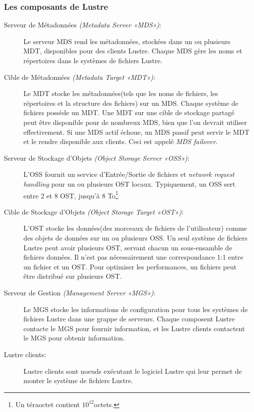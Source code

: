 \documentclass[12pt]{article}
\begin{document}
\subsubsection{Les composants de Lustre}
\begin{description}
\item[Serveur de Métadonnées \textit{(Metadata Server «MDS»)}:]
Le serveur MDS rend les métadonnées, stockées dans un ou plusieurs MDT, disponibles pour des clients Lustre. Chaque MDS gère les noms et répertoires dans le systèmes de fichiers Lustre.
\item[Cible de Métadonnées \textit{(Metadata Target «MDT»)}:] Le MDT stocke les métadonnées(tels que les noms de fichiers, les répertoires et la structure des fichiers) sur un MDS. Chaque système de fichiers possède un MDT. Une MDT sur une cible de stockage partagé peut être disponible pour de nombreux MDS, bien que l'on devrait utiliser effectivement. Si une MDS actif échoue, un MDS passif peut servir le MDT et le rendre disponible aux clients. Ceci est appelé \textit{MDS failover}.
\item[Serveur de Stockage d'Objets \textit{(Object Storage Server «OSS»)}:]
L'OSS fournit un service d'Entrée/Sortie de fichiers et \textit{network request handling} pour un ou plusieurs OST locaux. Typiquement, un OSS sert entre 2 et 8 OST, jusqu'à 8 To\footnote{Un téraoctet contient \begin{math}10^{12}\end{math}octets.}
\item[Cible de Stockage d'Objets \textit{(Object Storage Target «OST»)}:]
L'OST stocke les données(des morceaux de fichiers de l'utilisateur) comme des objets de données sur un ou plusieurs OSS. Un seul système de fichiers Lustre peut avoir plusieurs OST, servant chacun un sous-ensamble de fichiers données. Il n'est pas nécessairement une correspondance 1:1 entre un fichier et un OST. Pour optimiser les performances, un fichiers peut être distribué sur plusieurs OST.
\item[Serveur de Gestion \textit{(Management Server «MGS»)}:]
Le MGS stocke les informations de configuration pour tous les systèmes de fichiers Lustre dans une grappe de serveurs. Chaque composent Lustre contacte le MGS pour fournir information, et les Lustre clients contactent le MGS pour obtenir information.
\item[Lustre clients:]Lustre clients sont noeuds exécutant le logiciel Lustre qui leur permet de monter le système de fichiers Lustre.


\end{description}
\end{document}
